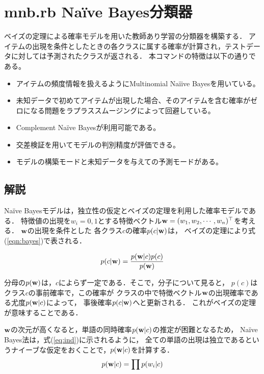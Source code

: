 

\section{mnb.rb Na{\"i}ve Bayes分類器\label{sect:nb}}
ベイズの定理による確率モデルを用いた教師あり学習の分類器を構築する．
アイテムの出現を条件としたときの各クラスに属する確率が計算され，テストデータに対しては予測されたクラスが返される．
本コマンドの特徴は以下の通りである。

\begin{itemize}
 \item アイテムの頻度情報を扱えるようにMultinomial Na{\"i}ive Bayesを用いている。
 \item 未知データで初めてアイテムが出現した場合、そのアイテムを含む確率がゼロになる問題をラプラススムージングによって回避している。
 \item Complement Na{\"i}ve Bayesが利用可能である。
 \item 交差検証を用いてモデルの判別精度が評価できる。
 \item モデルの構築モードと未知データを与えての予測モードがある。
\end{itemize}


\subsection{解説}

Na{\"i}ve Bayesモデルは，独立性の仮定とベイズの定理を利用した確率モデルである．
特徴値の出現を$w_i=0,1$とする特徴ベクトル${\bf w}=(w_1,w_2,\cdots,w_n)^\top$を考える．
${\bf w}$の出現を条件とした
各クラス$c$の確率$p(c|{\bf w})$は，
ベイズの定理により式(\ref{eqn:bayes})で表される．

\begin{equation}
p(c|{\bf w})=\frac{p({\bf w}|c)p(c)}{p({\bf w})}
\label{eqn:bayes}
\end{equation}

分母の$p({\bf w})$は，$c$によらず一定である．そこで，分子について見ると，
$p(c)$はクラス$c$の事前確率で，この確率が
クラスの中で特徴ベクトル${\bf w}$の出現確率である尤度$p({\bf w}|c)$によって，
事後確率$p(c|{\bf w})$へと更新される．
これがベイズの定理が意味することである．

${\bf w}$の次元が高くなると，単語の同時確率$p({\bf w}|c)$の推定が困難となるため，
Na{\"i}ve Bayes法は，式(\ref{eq:ind})に示されるように，
全ての単語の出現は独立であるというナイーブな仮定をおくことで，$p({\bf w}|c)$を計算する．
\begin{equation}
p({\bf w} | c)=\prod p(w_i|c)
\label{eq:ind}
\end{equation}

